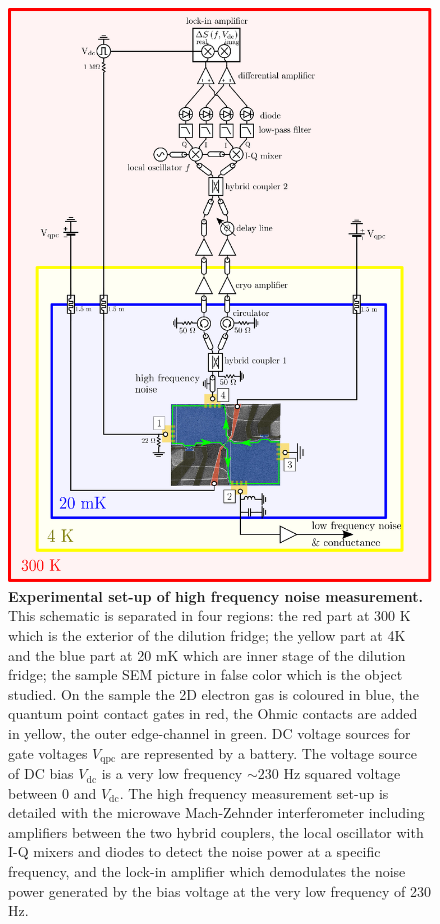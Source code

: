\begin{figure}
	\centering
	\includegraphics[width = 12cm]{./chap2/set-up_bruit_RF_pour_charge.eps}
	\caption{\textbf{Experimental set-up of high frequency noise measurement.} This schematic is separated in four regions: the red part at 300 K which is the exterior of the dilution fridge; the yellow part at 4K and the blue part at 20 mK which are inner stage of the dilution fridge; the sample SEM picture in false color which is the object studied. On the sample the 2D electron gas is coloured in blue, the quantum point contact gates in red, the Ohmic contacts are added in yellow, the outer edge-channel in green. DC voltage sources for gate voltages $V_{\mathrm{qpc}}$ are represented by a battery. The voltage source of DC bias $V_{\mathrm{dc}}$ is a very low frequency $\sim 230$ Hz squared voltage between 0 and $V_{\mathrm{dc}}$. The high frequency measurement set-up is detailed with the microwave Mach-Zehnder interferometer including amplifiers between the two hybrid couplers, the local oscillator with I-Q mixers and diodes to detect the noise power at a specific frequency, and the lock-in amplifier which demodulates the noise power generated by the bias voltage at the very low frequency of 230 Hz.  \label{fig: le set-up chap2}}
\end{figure}

